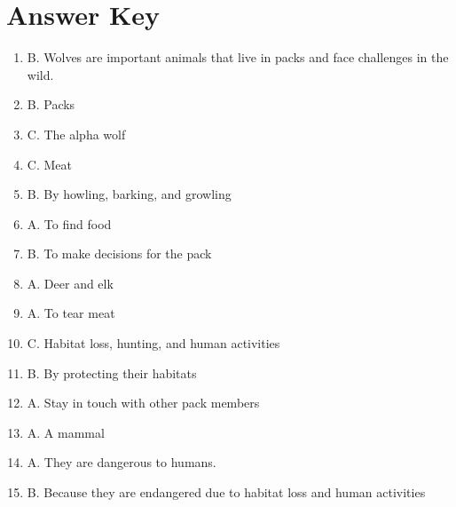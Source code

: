 \documentclass[12pt]{article}
\begin{document}
    \section*{Answer Key}
    \begin{enumerate}

        \item B. Wolves are important animals that live in packs and face challenges in the wild.
        \item B. Packs
        \item C. The alpha wolf
        \item C. Meat
        \item B. By howling, barking, and growling
        \item A. To find food
        \item B. To make decisions for the pack
        \item A. Deer and elk
        \item A. To tear meat
        \item C. Habitat loss, hunting, and human activities
        \item B. By protecting their habitats
        \item A. Stay in touch with other pack members
        \item A. A mammal
        \item A. They are dangerous to humans.
        \item B. Because they are endangered due to habitat loss and human activities

    \end{enumerate}
\end{document}
